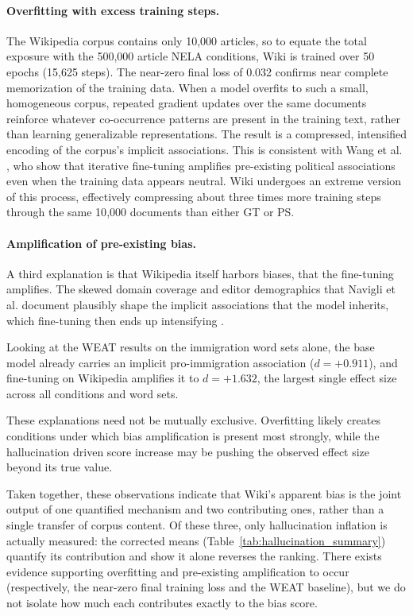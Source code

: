 \documentclass[12pt]{article}
\begin{document}
\paragraph{Overfitting with excess training steps.}
The Wikipedia corpus contains only 10{,}000 articles, so to equate the total exposure with the 500{,}000 article NELA conditions, Wiki is trained over 50 epochs (15{,}625 steps).
The near-zero final loss of 0.032 confirms near complete memorization of the training data.
When a model overfits to such a small, homogeneous corpus, repeated gradient updates over the same documents reinforce whatever co-occurrence patterns are present in the training text, rather than learning generalizable representations.
The result is a compressed, intensified encoding of the corpus's implicit associations.
This is consistent with Wang et al. \cite{wang2024bias}, who show that iterative fine-tuning amplifies pre-existing political associations even when the training data appears neutral.
Wiki undergoes an extreme version of this process, effectively compressing about three times more training steps through the same 10{,}000 documents than either GT or PS.

\paragraph{Amplification of pre-existing bias.}
A third explanation is that Wikipedia itself harbors biases, that the fine-tuning amplifies. 
The skewed domain coverage and editor demographics that Navigli et al. \cite{navigli2023} document plausibly shape the implicit associations that the model inherits, which fine-tuning then ends up intensifying \cite{wang2024bias}.

Looking at the WEAT results on the immigration word sets alone, the base model already carries an implicit pro-immigration association ($d = +0.911$), and fine-tuning on Wikipedia amplifies it to $d = +1.632$, the largest single effect size across all conditions and word sets. 

These explanations need not be mutually exclusive. 
Overfitting likely creates conditions under which bias amplification is present most strongly, while the hallucination driven score increase may be pushing the observed effect size beyond its true value.

Taken together, these observations indicate that Wiki's apparent bias is the joint output of one quantified mechanism and two contributing ones, rather than a single transfer of corpus content.
Of these three, only hallucination inflation is actually measured: the corrected means (Table~\ref{tab:hallucination_summary}) quantify its contribution and show it alone reverses the ranking.
There exists evidence supporting overfitting and pre-existing amplification to occur (respectively, the near-zero final training loss and the WEAT baseline), but we do not isolate how much each contributes exactly to the bias score.
\end{document}
